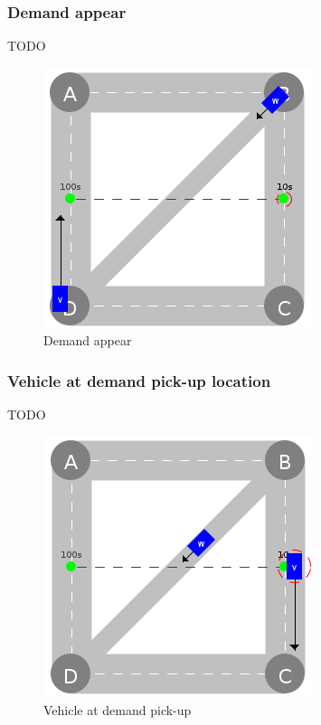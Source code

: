 \documentclass{IEEEtran}
\begin{document}
    \subsubsection{Demand appear}
    TODO

    \begin{figure}[htbp]
        \centering
        \includegraphics[scale=0.5]{../../events/demand.png}
        \caption{Demand appear}
        \label{fig:demand}
    \end{figure}

    \subsubsection{Vehicle at demand pick-up location}
    TODO

    \begin{figure}[htbp]
        \centering
        \includegraphics[scale=0.5]{../../events/vehicle-at-demand-pick-up.png}
        \caption{Vehicle at demand pick-up}
        \label{fig:vehicle-at-demand-pick-up}
    \end{figure}
\end{document}

